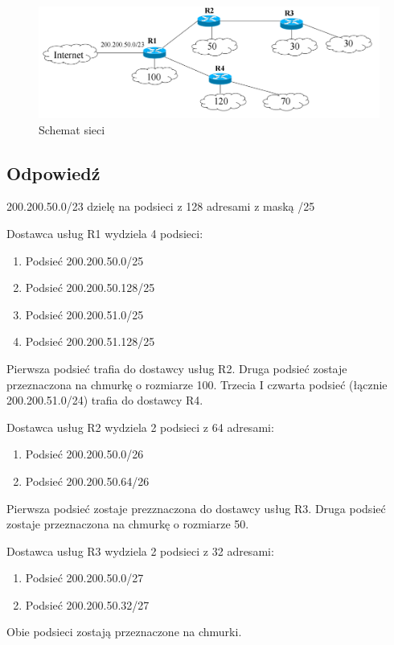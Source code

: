 \documentclass[polish, a4paper]{article}
\begin{document}
\begin{figure}[H]
\centering
\includegraphics[width=\textwidth]{siec.png}
\caption{Schemat sieci}
\end{figure}

\subsection{Odpowiedź}

200.200.50.0/23 dzielę na podsieci z 128 adresami z maską /25

Dostawca usług R1 wydziela 4 podsieci:
\begin{enumerate}
\item{Podsieć 200.200.50.0/25}
\item{Podsieć 200.200.50.128/25}
\item{Podsieć 200.200.51.0/25}
\item{Podsieć 200.200.51.128/25}
\end{enumerate}


Pierwsza podsieć trafia do dostawcy usług R2.
Druga podsieć zostaje przeznaczona na chmurkę o rozmiarze 100.
Trzecia I czwarta podsieć (łącznie 200.200.51.0/24) trafia do dostawcy R4.

Dostawca usług R2 wydziela 2 podsieci z 64 adresami:
\begin{enumerate}
\item{Podsieć 200.200.50.0/26}
\item{Podsieć 200.200.50.64/26}
\end{enumerate}

Pierwsza podsieć zostaje prezznaczona do dostawcy usług R3.
Druga podsieć zostaje przeznaczona na chmurkę o rozmiarze 50.

Dostawca usług R3 wydziela 2 podsieci z 32 adresami:
\begin{enumerate}
\item{Podsieć 200.200.50.0/27}
\item{Podsieć 200.200.50.32/27}
\end{enumerate}

Obie podsieci zostają przeznaczone na chmurki.
\end{document}
